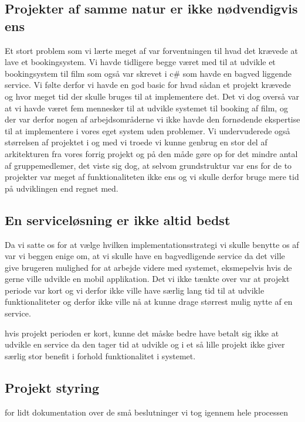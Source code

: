 \subsection{Projekter af samme natur er ikke nødvendigvis ens}
\label{Konklusion_Lessons_Projekt}
Et stort problem som vi lærte meget af var forventningen til hvad det krævede at lave et bookingsystem. Vi havde tidligere begge været med til at udvikle et bookingsystem til film som også var skrevet i c\# som havde en bagved liggende service. Vi følte derfor vi havde en god basic for hvad sådan et projekt krævede og hvor meget tid der skulle bruges til at implementere det. Det vi dog overså var at vi havde været fem mennesker til at udvikle systemet til booking af film, og der var derfor nogen af arbejdsområderne vi ikke havde den fornødende ekspertise til at implementere i vores eget system uden problemer. Vi undervuderede også størrelsen af projektet i og med vi troede vi kunne genbrug en stor del af arkitekturen fra vores forrig projekt og på den måde gøre op for det mindre antal af gruppemedlemer, det viste sig dog, at selvom grundstruktur var ens for de to projekter var meget af funktionaliteten ikke ens og vi skulle derfor bruge mere tid på udviklingen end regnet med.

\subsection{En serviceløsning er ikke altid bedst}
\label{Konklusion_Lessons_Service}
Da vi satte os for at vælge hvilken implementationsstrategi vi skulle benytte os af var vi beggen enige om, at vi skulle have en bagvedligende service da det ville give brugeren mulighed for at arbejde videre med systemet, eksmepelvis hvis de gerne ville udvikle en mobil applikation. Det vi ikke tænkte over var at projekt periode var kort og vi derfor ikke ville have særlig lang tid til at udvikle funktionaliteter og derfor ikke ville nå at kunne drage størrest mulig nytte af en service.

hvis projekt perioden er kort, kunne det måske bedre have betalt sig ikke at udvikle en service da den tager tid at udvikle og i et så lille projekt ikke giver særlig stor benefit i forhold funktionalitet i systemet.

\subsection{Projekt styring}
\label{Konklusion_Lessons_Styring}

for lidt dokumentation over de små beslutninger vi tog igennem hele processen